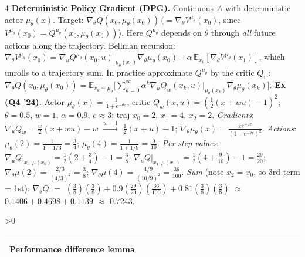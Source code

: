 \documentclass[10pt,landscape,letterpaper]{article}
\let\oldtextbf\textbf
\renewcommand{\textbf}[1]{\uline{\oldtextbf{#1}}}
\renewcommand{\section}[1]{%
  \ifnum\value{section}>0\par\vspace{1pt}\hrule\vspace{1pt}\fi
  \refstepcounter{section}\oldtextbf{\thesection\ #1}\ }
\begin{document}
\begin{multicols*}{4}
\textbf{Deterministic Policy Gradient (DPG).} Continuous \(A\) with deterministic actor \(\mu_\theta(x)\).
Target: \(\nabla_\theta Q(x_0,\mu_\theta(x_0))\,(=\nabla_\theta V^{\mu_\theta}(x_0)\), since \(V^{\mu_\theta}(x_0)=Q^{\mu_\theta}(x_0,\mu_\theta(x_0))\)).
Here \(Q^{\mu_\theta}\) depends on \(\theta\) through \emph{all} future actions along the trajectory. Bellman recursion:
\(\nabla_\theta V^{\mu_\theta}(x_0)=\nabla_u Q^{\mu_\theta}(x_0,u)|_{\mu_\theta(x_0)}\nabla_\theta\mu_\theta(x_0)\)
\(+\alpha\,\mathbb E_{x_1}[\nabla_\theta V^{\mu_\theta}(x_1)]\), which unrolls to a trajectory sum.
In practice approximate \(Q^{\mu_\theta}\) by the critic \(Q_w\):
\(\nabla_\theta Q(x_0,\mu_\theta(x_0))=\mathbb E_{x_k\sim\mu_\theta}\!\Big[\sum_{k=0}^\infty\alpha^k\nabla_u Q_w(x_k,u)|_{\mu_\theta(x_k)}\nabla_\theta\mu_\theta(x_k)\Big]\).
\textbf{Ex (Q4 '24).} Actor \(\mu_\theta(x){=}\tfrac{1}{1+e^{-\theta x}}\), critic \(Q_w(x,u){=}(\tfrac12(x{+}wu){-}1)^2\);
\(\theta{=}0.5,\,w{=}1,\,\alpha{=}0.9,\,e{\approx}3\); traj \(x_0{=}2,\,x_1{=}4,\,x_2{=}2\).
\emph{Gradients}: \(\nabla_u Q_w=\tfrac{w}{2}(x{+}wu)-w\) \(\xrightarrow{w=1}\) \(\tfrac12(x{+}u)-1\); \(\nabla_\theta\mu_\theta(x)=\tfrac{xe^{-\theta x}}{(1+e^{-\theta x})^2}\).
\emph{Actions}: \(\mu_\theta(2)=\tfrac{1}{1+1/3}=\tfrac34\); \(\mu_\theta(4)=\tfrac{1}{1+1/9}=\tfrac{9}{10}\).
\emph{Per-step values}: \(\nabla_u Q|_{x_0,\mu(x_0)}=\tfrac12(2{+}\tfrac34){-}1=\tfrac38\); \(\nabla_u Q|_{x_1,\mu(x_1)}=\tfrac12(4{+}\tfrac{9}{10}){-}1=\tfrac{29}{20}\); \(\nabla_\theta\mu(2)=\tfrac{2/3}{(4/3)^2}=\tfrac38\); \(\nabla_\theta\mu(4)=\tfrac{4/9}{(10/9)^2}=\tfrac{36}{100}\).
\emph{Sum} (note \(x_2{=}x_0\), so 3rd term = 1st): \(\nabla_\theta Q\) \(=\) \((\tfrac38)(\tfrac38)+0.9(\tfrac{29}{20})(\tfrac{36}{100})+0.81(\tfrac38)(\tfrac38)\) \(\approx\) \(0.1406+0.4698+0.1139\) \(\approx\) \(\mathbf{0.7243}\).

\section{Performance difference lemma}


\end{multicols*}
\end{document}

